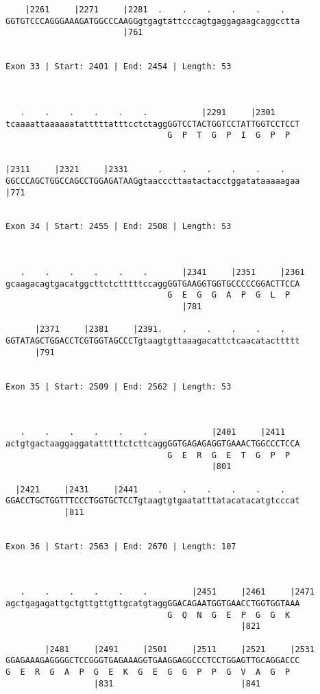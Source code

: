 \documentclass{article}
\begin{document}
\begin{Verbatim}
    |2261     |2271     |2281  .    .    .    .    .    .   
GGTGTCCCAGGGAAAGATGGCCCAAGGgtgagtattcccagtgaggagaagcaggcctta
                        |761                                
  
 
Exon 33 | Start: 2401 | End: 2454 | Length: 53



   .    .    .    .    .    .           |2291     |2301     
tcaaaattaaaaaatatttttatttcctctaggGGTCCTACTGGTCCTATTGGTCCTCCT
                                 G  P  T  G  P  I  G  P  P  
                                                            
  
|2311     |2321     |2331      .    .    .    .    .    .   
GGCCCAGCTGGCCAGCCTGGAGATAAGgtaacccttaatactacctggatataaaaagaa
|771                                                        
  
 
Exon 34 | Start: 2455 | End: 2508 | Length: 53



   .    .    .    .    .    .       |2341     |2351     |2361
gcaagacagtgacatggcttctctttttccaggGGTGAAGGTGGTGCCCCCGGACTTCCA
                                 G  E  G  G  A  P  G  L  P  
                                    |781                    
  
      |2371     |2381     |2391.    .    .    .    .    .   
GGTATAGCTGGACCTCGTGGTAGCCCTgtaagtgttaaagacattctcaacatacttttt
      |791                                                  
  
 
Exon 35 | Start: 2509 | End: 2562 | Length: 53



   .    .    .    .    .    .             |2401     |2411   
actgtgactaaggaggatatttttctcttcaggGGTGAGAGAGGTGAAACTGGCCCTCCA
                                 G  E  R  G  E  T  G  P  P  
                                          |801              
  
  |2421     |2431     |2441    .    .    .    .    .    .   
GGACCTGCTGGTTTCCCTGGTGCTCCTgtaagtgtgaatatttatacatacatgtcccat
            |811                                            
  
 
Exon 36 | Start: 2563 | End: 2670 | Length: 107



   .    .    .    .    .    .         |2451     |2461     |2471
agctgagagattgctgttgttgttgcatgtaggGGACAGAATGGTGAACCTGGTGGTAAA
                                 G  Q  N  G  E  P  G  G  K  
                                                |821        
  
        |2481     |2491     |2501     |2511     |2521     |2531
GGAGAAAGAGGGGCTCCGGGTGAGAAAGGTGAAGGAGGCCCTCCTGGAGTTGCAGGACCC
G  E  R  G  A  P  G  E  K  G  E  G  G  P  P  G  V  A  G  P  
                  |831                          |841        
  

\end{Verbatim}
\end{document}
